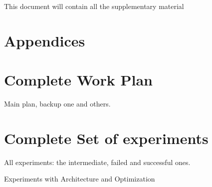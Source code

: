 \documentclass[11pt]{article}
\begin{document}
    This document will contain all the supplementary material


    \section{Appendices}\label{sec:appendices}


    \section{Complete Work Plan}\label{sec:complete-work-plan}
    Main plan, backup one and others.


    \section{Complete Set of experiments}\label{sec:complete-set-of-experiments}
    All experiments: the intermediate, failed and successful ones.


    Experiments with Architecture and Optimization
\end{document}
